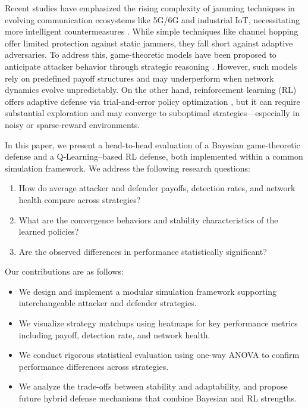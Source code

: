 \documentclass[conference]{IEEEtran}
\begin{document}
Recent studies have emphasized the rising complexity of jamming techniques in evolving communication ecosystems like 5G/6G and industrial IoT, necessitating more intelligent countermeasures \cite{lohan2024ai, bensaad2023jamming}. While simple techniques like channel hopping offer limited protection against static jammers, they fall short against adaptive adversaries. To address this, game-theoretic models have been proposed to anticipate attacker behavior through strategic reasoning \cite{jia2022game}. However, such models rely on predefined payoff structures and may underperform when network dynamics evolve unpredictably. On the other hand, reinforcement learning (RL) offers adaptive defense via trial-and-error policy optimization \cite{tang2024adaptive}, but it can require substantial exploration and may converge to suboptimal strategies—especially in noisy or sparse-reward environments.

In this paper, we present a head-to-head evaluation of a Bayesian game-theoretic defense and a Q-Learning–based RL defense, both implemented within a common simulation framework. We address the following research questions:
\begin{enumerate}
  \item How do average attacker and defender payoffs, detection rates, and network health compare across strategies?  
  \item What are the convergence behaviors and stability characteristics of the learned policies?  
  \item Are the observed differences in performance statistically significant?  
\end{enumerate}

Our contributions are as follows:
\begin{itemize}
  \item We design and implement a modular simulation framework supporting interchangeable attacker and defender strategies.  
  \item We visualize strategy matchups using heatmaps for key performance metrics including payoff, detection rate, and network health.  
  \item We conduct rigorous statistical evaluation using one-way ANOVA to confirm performance differences across strategies.  
  \item We analyze the trade-offs between stability and adaptability, and propose future hybrid defense mechanisms that combine Bayesian and RL strengths.  
\end{itemize}
\end{document}
